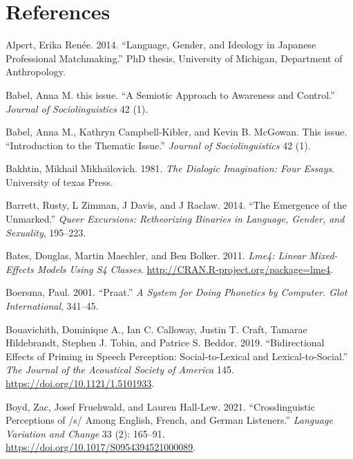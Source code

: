 \documentclass[
  letterpaper,
  DIV=11,
  numbers=noendperiod]{scrartcl}
\newlength{\cslhangindent}
\newenvironment{CSLReferences}[2] %
 {\begin{list}{}{%
  \setlength{\itemindent}{0pt}
  \setlength{\leftmargin}{0pt}
  \setlength{\parsep}{0pt}
  \ifodd #1
   \setlength{\leftmargin}{\cslhangindent}
   \setlength{\itemindent}{-1\cslhangindent}
  \fi
  \setlength{\itemsep}{#2\baselineskip}}}
 {\end{list}}
\begin{document}
\section*{References}\label{sec-references}

\label{refs}
\begin{CSLReferences}{1}{0}
Alpert, Erika Renée. 2014. {``Language, Gender, and Ideology in Japanese
Professional Matchmaking.''} PhD thesis, University of Michigan,
Department of Anthropology.

Babel, Anna M. this issue. {``A Semiotic Approach to Awareness and
Control.''} \emph{Journal of Sociolinguistics} 42 (1).

Babel, Anna M., Kathryn Campbell-Kibler, and Kevin B. McGowan. This
issue. {``Introduction to the Thematic Issue.''} \emph{Journal of
Sociolinguistics} 42 (1).

Bakhtin, Mikhail Mikhaı̆lovich. 1981. \emph{The Dialogic Imagination:
Four Essays}. University of texas Press.

Barrett, Rusty, L Zimman, J Davis, and J Raclaw. 2014. {``The Emergence
of the Unmarked.''} \emph{Queer Excursions: Retheorizing Binaries in
Language, Gender, and Sexuality}, 195--223.

Bates, Douglas, Martin Maechler, and Ben Bolker. 2011. \emph{Lme4:
Linear Mixed-Effects Models Using S4 Classes}.
\url{http://CRAN.R-project.org/package=lme4}.

Boersma, Paul. 2001. {``Praat.''} \emph{A System for Doing Phonetics by
Computer. {Glot} {International}}, 341--45.

Bouavichith, Dominique A., Ian C. Calloway, Justin T. Craft, Tamarae
Hildebrandt, Stephen J. Tobin, and Patrice S. Beddor. 2019.
{``Bidirectional Effects of Priming in Speech Perception:
Social-to-Lexical and Lexical-to-Social.''} \emph{The Journal of the
Acoustical Society of America} 145.
\url{https://doi.org/10.1121/1.5101933}.

Boyd, Zac, Josef Fruehwald, and Lauren Hall-Lew. 2021.
{``Crosslinguistic Perceptions of /s/ Among English, French, and German
Listeners.''} \emph{Language Variation and Change} 33 (2): 165--91.
\url{https://doi.org/10.1017/S0954394521000089}.


\end{CSLReferences}
\end{document}
